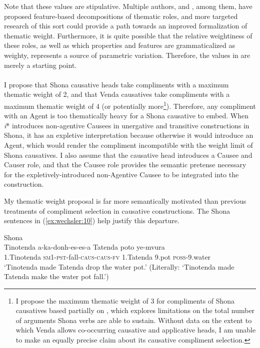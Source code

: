 \documentclass[output=paper,modfonts,nonflat]{langsci/langscibook}
\begin{document}
Note that these values are stipulative. Multiple authors, \citet{Wunderlich1997} and \citet{Mylne1999}, among them, have proposed feature-based decompositions of thematic roles, and more targeted research of this sort could provide a path towards an improved formalization of thematic weight. Furthermore, it is quite possible that the relative weightiness of these roles, as well as which properties and features are grammaticalized as weighty, represents a source of parametric variation. Therefore, the values in  are merely a starting point.\\
\\
I propose that Shona causative heads take compliments with a maximum thematic weight of 2, and that Venda causatives take compliments with a maximum thematic weight of 4 (or potentially more\footnote{I propose the maximum thematic weight of 3 for compliments of Shona causatives based partially on \citet{Wechsler2014}, which explores limitations on the total number of arguments Shona verbs are able to sustain. Without data on the extent to which Venda allows co-occurring causative and applicative heads, I am unable to make an equally precise claim about its causative compliment selection.}). Therefore, any compliment with an Agent is too thematically heavy for a Shona causative to embed. When \textit{i}* introduces non-agentive Causees in unergative and transitive constructions in Shona, it has an expletive interpretation because otherwise it would introduce an Agent, which would render the compliment incompatible with the weight limit of Shona causatives. I also assume that the causative head introduces a Causee and Causer role, and that the Causee role provides the semantic pretense necessary for the expletively-introduced non-Agentive Causee to be integrated into the construction. 



My thematic weight proposal is far more semantically motivated than previous treatments of compliment selection in causative constructions. The Shona sentences in (\ref{ex:wechsler:10}) help justify this departure.


\ea\label{ex:wechsler:10}
Shona\\ 
\ea\label{ex:wechsler:10a}
\gll Tinotenda {a-ka-donh-es-es-a}  {{Tatenda}}  {{poto}} {ye-mvura}\\
 1.Tinotenda  \textsc{sm}1-\textsc{pst}{}-fall-\textsc{caus}{}-\textsc{caus}{}-\textsc{fv}  {1.Tatenda}  {9.pot}  \textsc{poss}{}-9.water\\
\glt `Tinotenda made Tatenda drop the water pot.’
(Literally: ‘Tinotenda made Tatenda make the water pot fall.’)\\
\end{document}
